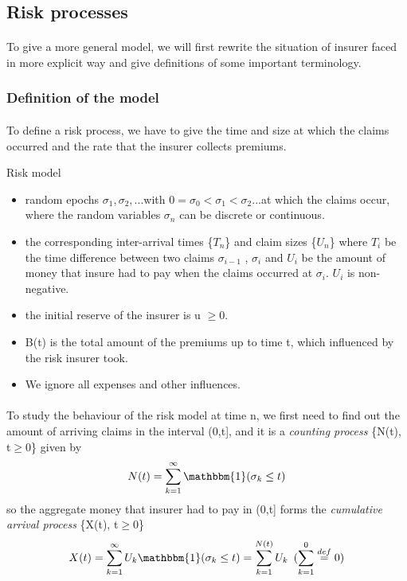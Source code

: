 \documentclass[project2.tex]{subfiles}
\begin{document}
\subsection{Risk processes}
\paragraph{}
To give a more general model, we will first rewrite the situation of insurer faced in more explicit way and give definitions of some important terminology.
\subsubsection{Definition of the model}
\paragraph{}
To define a risk process, we have to give the time and size at which the claims occurred and the rate that the insurer collects premiums.
\begin{definition}
Risk model
\end{definition}
\begin{itemize}
 \item  random epochs $\sigma_1,\sigma_2,...$with $0=\sigma_0<\sigma_1<\sigma_2...$at which the claims occur, where the random variables $\sigma_n$ can be discrete or continuous.
 \item  the corresponding inter-arrival times \{$T_n$\} and claim sizes \{$U_n$\} where $T_i$ be the time difference between two claims $\sigma_{i-1}$ , $\sigma_{i}$ and $U_i$ be the amount of money that insure had to pay when the claims occurred at $\sigma_i$. $U_i$ is non-negative.
 \item the initial reserve of the insurer is u $\geq0$.
 \item B(t) is the total amount of the premiums up to time t, which influenced by the risk insurer took.
 \item We ignore all expenses and other influences.
 \end{itemize}

\paragraph{}
To study the behaviour of the risk model at time n, we first need to find out the amount of arriving claims in the interval (0,t], and it is a {\it counting process} \{N(t), t$\geq 0$\} given by $$N(t)=\sum^{\infty}_{k=1} \mathbbm{1}(\sigma_k \leq t)$$ so the aggregate money that insurer had to pay in (0,t] forms the {\it cumulative arrival process} \{X(t), t$\geq 0$\} $$X(t)=\sum^{\infty}_{k=1}U_k \mathbbm{1}(\sigma_k \leq t)=\sum^{N(t)}_{k=1}U_k\hspace{5pt}(\sum_{k=1}^0 \overset{def}{=}0)$$
\end{document}
